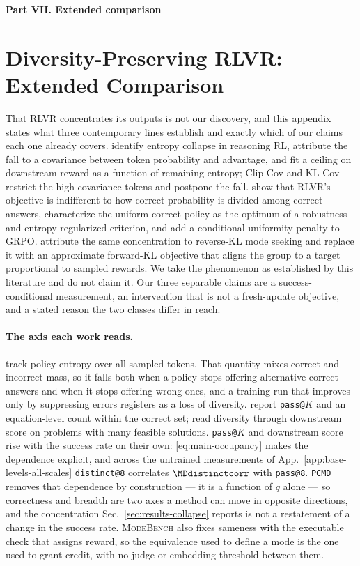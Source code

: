 \documentclass{article}
\makeatletter
\newcommand{\1}{\mathbf 1}
\newcommand{\mb}{\textsc{ModeBench}}
\newcommand{\pmd}{\texttt{PCMD}}
\newcommand{\distk}{\texttt{distinct@8}}
\theoremstyle{remark}
\theoremstyle{definition}
\theoremstyle{plain}
\makeatother
\begin{document}
\clearpage
{}
\begin{center}\large\textbf{Part VII. Extended comparison}\end{center}

\section{Diversity-Preserving RLVR: Extended Comparison}
\label{app:related-extended}

That RLVR concentrates its outputs is not our discovery, and this appendix
states what three contemporary lines establish and exactly which of our claims
each one already covers.
\citet{cui2025entropy} identify entropy collapse in reasoning RL, attribute the
fall to a covariance between token probability and advantage, and fit a ceiling
on downstream reward as a function of remaining entropy; Clip-Cov and KL-Cov
restrict the high-covariance tokens and postpone the fall.
\citet{lochab2026ucpo} show that RLVR's objective is indifferent to how correct
probability is divided among correct answers, characterize the uniform-correct
policy as the optimum of a robustness and entropy-regularized criterion, and
add a conditional uniformity penalty to GRPO.
\citet{li2026distribution} attribute the same concentration to reverse-KL
mode seeking and replace it with an approximate forward-KL objective that
aligns the group to a target proportional to sampled rewards.
We take the phenomenon as established by this literature and do not claim it.
Our three separable claims are a success-conditional measurement, an
intervention that is not a fresh-update objective, and a stated reason the two
classes differ in reach.

\paragraph{The axis each work reads.}
\citet{cui2025entropy} track policy entropy over all sampled tokens. That
quantity mixes correct and incorrect mass, so it falls both when a policy stops
offering alternative correct answers and when it stops offering wrong ones, and
a training run that improves only by suppressing errors registers as a loss of
diversity. \citet{lochab2026ucpo} report \texttt{pass@}$K$ and an
equation-level count within the correct set; \citet{li2026distribution} read
diversity through downstream score on problems with many feasible solutions.
\texttt{pass@}$K$ and downstream score rise with the success rate on their
own: \eqref{eq:main-occupancy} makes the dependence explicit, and across the
\MDcells{} untrained measurements of App.~\ref{app:base-levels-all-scales}
\distk{} correlates $\MDdistinctcorr$ with \texttt{pass@8}.
\pmd{} removes that dependence by construction --- it is a function of $q$
alone --- so correctness and breadth are two axes a method can move in opposite
directions, and the concentration Sec.~\ref{sec:results-collapse} reports is
not a restatement of a change in the success rate. \mb{} also fixes sameness with the executable check that assigns
reward, so the equivalence used to define a mode is the one used to grant
credit, with no judge or embedding threshold between them.
\end{document}
